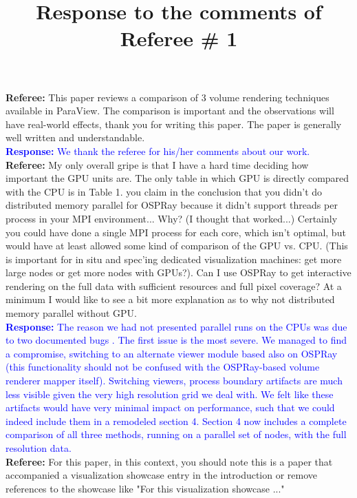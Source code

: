\documentclass[]{article}
\title{Response to the comments of Referee \# 1}
\begin{document}
\maketitle
\textbf{Referee:} This paper reviews a comparison of 3 volume rendering techniques available in ParaView. The comparison is important and the observations will have real-world effects, thank you for writing this paper. The paper is generally well written and understandable. \\

\textcolor{blue}{\textbf{Response:} We thank the referee for his/her comments about our work.} \\

\textbf{Referee:} My only overall gripe is that I have a hard time deciding how important the GPU units are. The only table in which GPU is directly compared with the CPU is in Table 1. you claim in the conclusion that you didn't do distributed memory parallel for OSPRay because it didn't support threads per process in your MPI environment... Why? (I thought that worked...) Certainly you could have done a single MPI process for each core, which isn't optimal, but would have at least allowed some kind of comparison of the GPU vs. CPU.  (This is important for in situ and spec'ing dedicated visualization machines: get more large nodes or get more nodes with GPUs?). Can I use OSPRay to get interactive rendering on the full data with sufficient resources and full pixel coverage? At a minimum I would like to see a bit more explanation as to why not distributed memory parallel without GPU.\\

\textcolor{blue}{\textbf{Response:} The reason we had not presented parallel runs on the CPUs was due to two documented bugs \cite{issue1, issue2}. The first issue is the most severe. We managed to find a compromise, switching to an alternate viewer module based also on OSPRay (this functionality should not be confused with the OSPRay-based volume renderer mapper itself). Switching viewers, process boundary artifacts are much less visible given the very high resolution grid we deal with. We felt like these artifacts would have very minimal impact on performance, such that we could indeed include them in a remodeled section 4. Section 4 now includes a complete comparison of all three methods, running on a parallel set of nodes, with the full resolution data.} \\

\textbf{Referee:} For this paper, in this context, you should note this is a paper that accompanied a visualization showcase entry in the introduction or remove references to the showcase like "For this visualization showcase ..." \\
\end{document}
